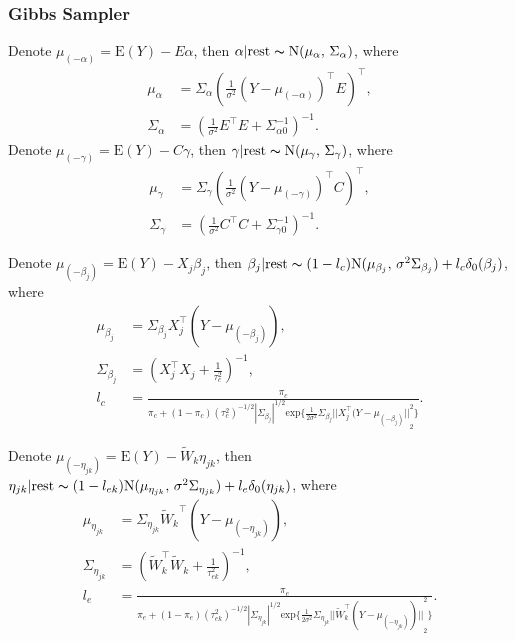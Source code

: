 \documentclass[12pt]{article}
\begin{document}
\subsubsection{Gibbs Sampler}
Denote $\mu_{(-\alpha)}=\text{E}(Y)-E\alpha$, then $\alpha|\text{rest} \thicksim \text{N}(\mu_{\alpha}, \, \Sigma_{\alpha})$, where
\begin{equation*}
	\begin{aligned}
	\mu_{\alpha} &= \Sigma_{\alpha}(\frac{1}{\sigma^2}(Y-\mu_{(-\alpha)})^\top E)^\top, \\
	\Sigma_{\alpha} &= \left(\frac{1}{\sigma^{2}}E^\top E + \Sigma_{\alpha0}^{-1} \right)^{-1} .
	\end{aligned}
	\end{equation*}
Denote $\mu_{(-\gamma)}=\text{E}(Y)-C\gamma$, then $\gamma|\text{rest} \thicksim \text{N}(\mu_{\gamma}, \, \Sigma_{\gamma})$, where
\begin{equation*}
	\begin{aligned}
	\mu_{\gamma} &= \Sigma_{\gamma}(\frac{1}{\sigma^2}(Y-\mu_{(-\gamma)})^\top C)^\top, \\
	\Sigma_{\gamma} &= \left(\frac{1}{\sigma^{2}}C^\top C + \Sigma_{\gamma0}^{-1} \right)^{-1}. 
	\end{aligned}
	\end{equation*}

Denote $\mu_{(-\beta_j)}=\text{E}(Y)-X_{j}\beta_j$, then $\beta_{j}|\text{rest} \thicksim (1-l_{c}) \text{N}(\mu_{\beta_{j}}, \, \sigma^{2} \Sigma_{\beta_{j}}) + l_{c}\delta_{0}(\beta_{j})$, where
	\begin{equation*}
	\begin{aligned}
	\mu_{\beta_{j}} &= \Sigma_{\beta_{j}} X_{j}^\top(Y-\mu_{(-\beta_j)}), \\
	\Sigma_{\beta_{j}} &= \left(X_{j}^\top X_{j} + \frac{1}{\tau_{c}^{2}} \right)^{-1},\\
	l_{c} &= \frac{\pi_{c}}{\pi_{c} + (1-\pi_{c})(\tau_{c}^{2})^{-1/2}{|\Sigma_{\beta_{j}}|}^{1/2}\text{exp}\big\{ \frac{1}{2 \sigma^2} \Sigma_{\beta_{j}}{||X_{j}^\top(Y-\mu_{(-\beta_j)}||}_{2}^{2}\big\} }.
	\end{aligned}
	\end{equation*}

Denote $\mu_{(-\eta_{jk})}=\text{E}(Y)-\tilde{W}_{k}\eta_{jk}$, then $\eta_{jk}|\text{rest} \thicksim (1-l_{ek}) \text{N}(\mu_{\eta_{jk}}, \, \sigma^{2}\Sigma_{\eta_{jk}}) + l_{e}\delta_{0}(\eta_{jk})$, where
	\begin{equation*}
	\begin{aligned}
	\mu_{\eta_{jk}} &= \Sigma_{\eta_{jk}} {\tilde{W}_{k}}^\top(Y-\mu_{(-\eta_{jk})}), \\
	\Sigma_{\eta_{jk}} &= \left(\tilde{W}_{k}^\top \tilde{W}_{k} + \frac{1}{\tau_{ek}^{2}} \right)^{-1},\\
	l_{e} &= \frac{\pi_{e}}{\pi_{e} + (1-\pi_{e})(\tau_{ek}^{2})^{-1/2}{|\Sigma_{\eta_{jk}}|}^{1/2}\text{exp}\big\{ \frac{1}{2 \sigma^2} \Sigma_{\eta_{jk}}{||\tilde{W}_{k}^\top(Y-\mu_{(-\eta_{jk})})||}_2^{2}\big\} }.
	\end{aligned}
	\end{equation*}
\end{document}
